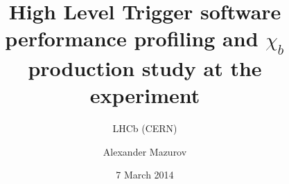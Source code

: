 \title[chib status report]{High Level Trigger software performance profiling and $\chi_{b}$ production study at the \lhcb experiment}
\subtitle{LHCb  (CERN)}
\author{Alexander Mazurov}
\date{7 March 2014}
